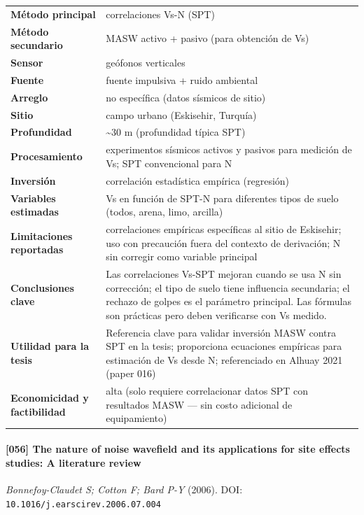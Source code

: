 \begin{center}\scriptsize
\begin{tabularx}{\textwidth}{@{}>{\bfseries}p{3.3cm} X@{}}
\toprule
M\'etodo principal & correlaciones Vs-N (SPT) \\
M\'etodo secundario & MASW activo + pasivo (para obtención de Vs) \\
Sensor & geófonos verticales \\
Fuente & fuente impulsiva + ruido ambiental \\
Arreglo & no específica (datos sísmicos de sitio) \\
Sitio & campo urbano (Eskisehir, Turquía) \\
Profundidad & \textasciitilde{}30 m (profundidad típica SPT) \\
Procesamiento & experimentos sísmicos activos y pasivos para medición de Vs; SPT convencional para N \\
Inversi\'on & correlación estadística empírica (regresión) \\
Variables estimadas & Vs en función de SPT-N para diferentes tipos de suelo (todos, arena, limo, arcilla) \\
Limitaciones reportadas & correlaciones empíricas específicas al sitio de Eskisehir; uso con precaución fuera del contexto de derivación; N sin corregir como variable principal \\
Conclusiones clave & Las correlaciones Vs-SPT mejoran cuando se usa N sin corrección; el tipo de suelo tiene influencia secundaria; el rechazo de golpes es el parámetro principal. Las fórmulas son prácticas pero deben verificarse con Vs medido. \\
Utilidad para la tesis & Referencia clave para validar inversión MASW contra SPT en la tesis; proporciona ecuaciones empíricas para estimación de Vs desde N; referenciado en Alhuay 2021 (paper 016) \\
Economicidad y factibilidad & alta (solo requiere correlacionar datos SPT con resultados MASW --- sin costo adicional de equipamiento) \\
\bottomrule
\end{tabularx}
\end{center}

\paragraph{[056] The nature of noise wavefield and its applications for site effects studies: A literature review} \emph{Bonnefoy-Claudet S; Cotton F; Bard P-Y} (2006).
{\scriptsize DOI: \texttt{10.1016/j.earscirev.2006.07.004}}

